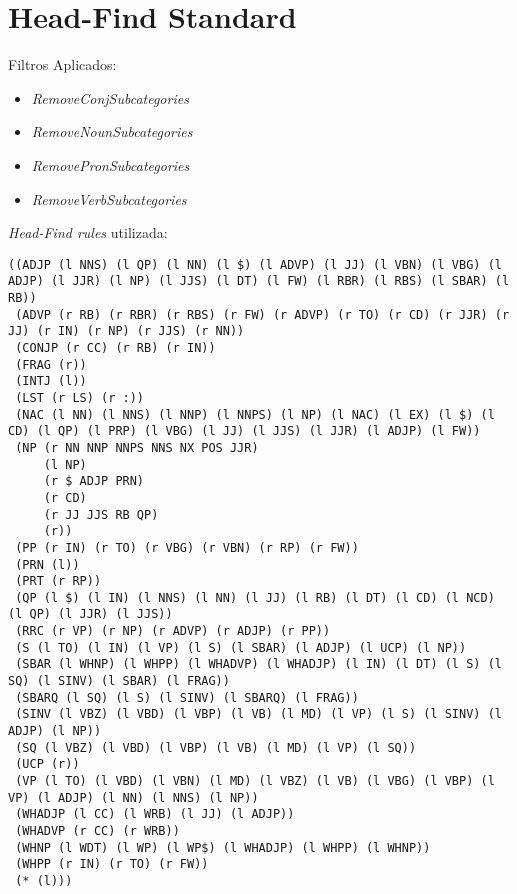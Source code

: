\section{Head-Find Standard} %
\label{sec:exp:2009.11.19_20.59.13-remove_conj_subcategories-remove_noun_subcategories-remove_pron_subcategories-remove_verb_subcategories--headfind-standard}

Filtros Aplicados:


\begin{itemize}
  
  \item{\emph{RemoveConjSubcategories}}
  
  \item{\emph{RemoveNounSubcategories}}
  
  \item{\emph{RemovePronSubcategories}}
  
  \item{\emph{RemoveVerbSubcategories}}
  
\end{itemize}


\emph{Head-Find rules} utilizada:

\scriptsize
\begin{verbatim}
((ADJP (l NNS) (l QP) (l NN) (l $) (l ADVP) (l JJ) (l VBN) (l VBG) (l ADJP) (l JJR) (l NP) (l JJS) (l DT) (l FW) (l RBR) (l RBS) (l SBAR) (l RB))
 (ADVP (r RB) (r RBR) (r RBS) (r FW) (r ADVP) (r TO) (r CD) (r JJR) (r JJ) (r IN) (r NP) (r JJS) (r NN))
 (CONJP (r CC) (r RB) (r IN))
 (FRAG (r))
 (INTJ (l))
 (LST (r LS) (r :))
 (NAC (l NN) (l NNS) (l NNP) (l NNPS) (l NP) (l NAC) (l EX) (l $) (l CD) (l QP) (l PRP) (l VBG) (l JJ) (l JJS) (l JJR) (l ADJP) (l FW))
 (NP (r NN NNP NNPS NNS NX POS JJR)
     (l NP)
     (r $ ADJP PRN)
     (r CD)
     (r JJ JJS RB QP)
     (r))
 (PP (r IN) (r TO) (r VBG) (r VBN) (r RP) (r FW))
 (PRN (l))
 (PRT (r RP))
 (QP (l $) (l IN) (l NNS) (l NN) (l JJ) (l RB) (l DT) (l CD) (l NCD) (l QP) (l JJR) (l JJS))
 (RRC (r VP) (r NP) (r ADVP) (r ADJP) (r PP))
 (S (l TO) (l IN) (l VP) (l S) (l SBAR) (l ADJP) (l UCP) (l NP))
 (SBAR (l WHNP) (l WHPP) (l WHADVP) (l WHADJP) (l IN) (l DT) (l S) (l SQ) (l SINV) (l SBAR) (l FRAG))
 (SBARQ (l SQ) (l S) (l SINV) (l SBARQ) (l FRAG))
 (SINV (l VBZ) (l VBD) (l VBP) (l VB) (l MD) (l VP) (l S) (l SINV) (l ADJP) (l NP))
 (SQ (l VBZ) (l VBD) (l VBP) (l VB) (l MD) (l VP) (l SQ))
 (UCP (r))
 (VP (l TO) (l VBD) (l VBN) (l MD) (l VBZ) (l VB) (l VBG) (l VBP) (l VP) (l ADJP) (l NN) (l NNS) (l NP))
 (WHADJP (l CC) (l WRB) (l JJ) (l ADJP))
 (WHADVP (r CC) (r WRB))
 (WHNP (l WDT) (l WP) (l WP$) (l WHADJP) (l WHPP) (l WHNP))
 (WHPP (r IN) (r TO) (r FW))
 (* (l)))

\end{verbatim}

